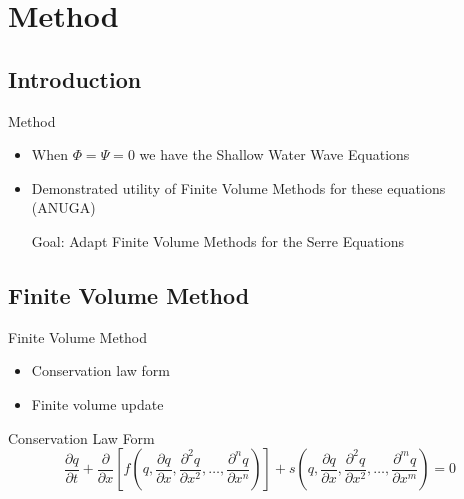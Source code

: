 \documentclass[pdf]{beamer}
\begin{document}
\section{Method}
\subsection{Introduction}
\begin{frame}{Method}
	\begin{itemize}
		\item When $\Phi = \Psi =0$ we have the Shallow Water Wave Equations
		\pause
		\item Demonstrated utility of Finite Volume Methods for these equations (ANUGA) \\
		\pause
		\item[Goal:] Adapt Finite Volume Methods for the Serre Equations
	\end{itemize}
\end{frame}

\subsection{Finite Volume Method}
\begin{frame}[label=FVM]{Finite Volume Method}
	\begin{itemize}
		\item Conservation law form
		\pause
		\item Finite volume update 
	\end{itemize}
\end{frame}


\begin{frame}[label=ConLawForm]{Conservation Law Form}
	\begin{equation*}
	{\frac{\partial q}{\partial t}} +  {\frac{\partial}{\partial x}} \left[ f\left(q,{\frac{\partial q}{\partial x}}, {\frac{\partial^2 q}{\partial x^2}}, \dots,{\frac{\partial^n q}{\partial x^n}}\right)\right] + s\left(q,{\frac{\partial q}{\partial x}}, {\frac{\partial^2 q}{\partial x^2}}, \dots,{\frac{\partial^m q}{\partial x^m}}\right) = 0
	\end{equation*}
\end{frame}
\end{document}
